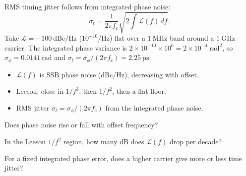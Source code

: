 \begin{workedexample}
RMS timing jitter follows from integrated phase noise:
\[ \sigma_t = \frac{1}{2\pi f_c}\sqrt{2\int \mathcal{L}(f)\,df}. \]
Take $\mathcal{L} = -100\ \text{dBc/Hz}$ ($10^{-10}/\text{Hz}$) flat over a
$1\ \text{MHz}$ band around a $1\ \text{GHz}$ carrier. The integrated phase
variance is $2\times10^{-10}\times10^{6} = 2\times10^{-4}\ \text{rad}^2$, so
$\sigma_\phi = 0.0141\ \text{rad}$ and $\sigma_t = \sigma_\phi/(2\pi f_c) = 2.25\ \text{ps}$.
\end{workedexample}

\begin{keytakeaways}
\begin{itemize}[leftmargin=1.4em,itemsep=2pt]
\item $\mathcal{L}(f)$ is SSB phase noise (dBc/Hz), decreasing with offset.
\item Leeson: close-in $1/f^3$, then $1/f^2$, then a flat floor.
\item RMS jitter $\sigma_t = \sigma_\phi/(2\pi f_c)$ from the integrated phase noise.
\end{itemize}
\end{keytakeaways}

\begin{exercises}
\item Does phase noise rise or fall with offset frequency?
\item In the Leeson $1/f^2$ region, how many dB does $\mathcal{L}(f)$ drop per decade?
\item For a fixed integrated phase error, does a higher carrier give more or less time jitter?
\end{exercises}

